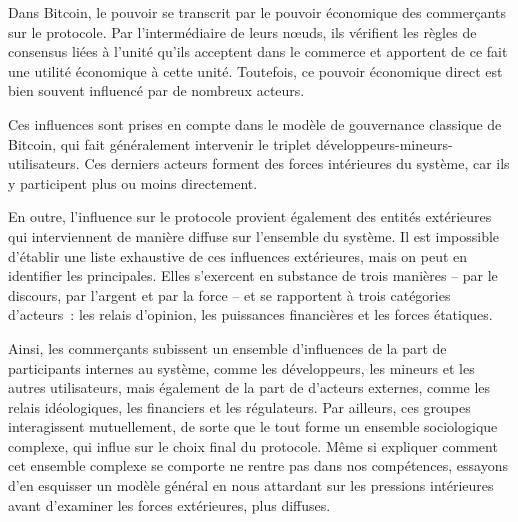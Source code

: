 Dans Bitcoin, le pouvoir se transcrit par le pouvoir économique des commerçants sur le protocole. Par l'intermédiaire de leurs nœuds, ils vérifient les règles de consensus liées à l'unité qu'ils acceptent dans le commerce et apportent de ce fait une utilité économique à cette unité. Toutefois, ce pouvoir économique direct est bien souvent influencé par de nombreux acteurs.

Ces influences sont prises en compte dans le modèle de gouvernance classique de Bitcoin, qui fait généralement intervenir le triplet développeurs-mineurs-utilisateurs. Ces derniers acteurs forment des forces intérieures du système, car ils y participent plus ou moins directement.

En outre, l'influence sur le protocole provient également des entités extérieures qui interviennent de manière diffuse sur l'ensemble du système. Il est impossible d'établir une liste exhaustive de ces influences extérieures, mais on peut en identifier les principales. Elles s'exercent en substance de trois manières -- par le discours, par l'argent et par la force -- et se rapportent à trois catégories d'acteurs~: les relais d'opinion, les puissances financières et les forces étatiques.

Ainsi, les commerçants subissent un ensemble d'influences de la part de participants internes au système, comme les développeurs, les mineurs et les autres utilisateurs, mais également de la part de d'acteurs externes, comme les relais idéologiques, les financiers et les régulateurs. Par ailleurs, ces groupes interagissent mutuellement, de sorte que le tout forme un ensemble sociologique complexe, qui influe sur le choix final du protocole. Même si expliquer comment cet ensemble complexe se comporte ne rentre pas dans nos compétences, essayons d'en esquisser un modèle général en nous attardant sur les pressions intérieures avant d'examiner les forces extérieures, plus diffuses.

